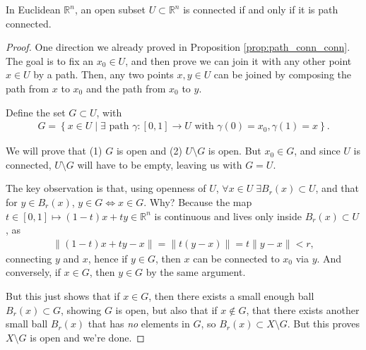 \begin{theorem}\label{thm:RR_conn_iff_path_conn}
	In Euclidean $\mathbb{R}^{n}$, an open subset $U \subset \mathbb{R}^{n}$ is connected if and only if it is path connected.
\end{theorem}
\begin{proof}
	One direction we already proved in Proposition \ref{prop:path_conn_conn}. The goal is to fix an $x_{0} \in U$, and then prove we can join it with any other point $x \in U$ by a path. Then, any two points $x,y \in U$ can be joined by composing the path from $x$ to $x_{0}$ and the path from $x_{0}$ to $y$.

	Define the set $G \subset U$, with
	\begin{align*}
		G = \left\{ x \in U \mid \exists \text{ path } \gamma :[0,1] \to U \text{ with } \gamma (0) = x_{0}, \gamma(1) = x \right\}.
	\end{align*}

	We will prove that (1) $G$ is open and (2) $U \setminus G$ is open. But $x_{0} \in G$, and since $U$ is connected, $U \setminus G$ will have to be empty, leaving us with $G = U$.

	The key observation is that, using openness of $U$, $\forall x \in U \; \exists B_{r}(x) \subset U$, and that for $y \in B_{r}(x)$, $y \in G \iff x \in G$. Why? Because the map $t \in [0,1] \mapsto (1-t)x + ty \in \mathbb{R}^{n}$ is continuous and lives only inside $B_{r}(x) \subset U$, as
	\begin{align*}
		\lVert (1-t)x + ty - x \rVert = \lVert t(y-x) \rVert = t \lVert y-x \rVert < r,
	\end{align*}
	connecting $y$ and $x$, hence if $y \in G$, then $x$ can be connected to $x_{0}$ via $y$. And conversely, if $x \in G$, then $y \in G$ by the same argument.

	But this just shows that if $x \in G$, then there exists a small enough ball $B_{r}(x) \subset G$, showing $G$ is open, but also that if $x \not \in G$, that there exists another small ball $B_{r}(x)$ that has \textit{no} elements in $G$, so $B_{r}(x) \subset X \setminus G$. But this proves $X \setminus G$ is open and we're done.
\end{proof}

